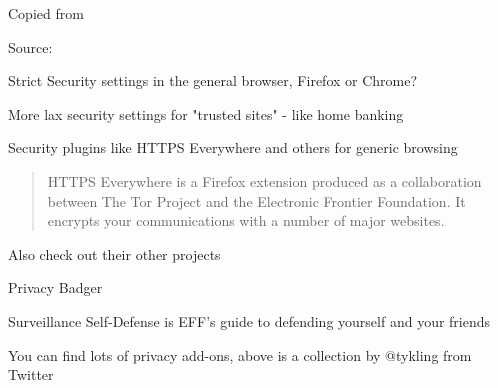 \documentclass[20pt,landscape,a4paper,footrule]{foils}
\begin{document}
Copied from 





Source:



\begin{list2}
\item Strict Security settings in the general browser, Firefox or Chrome?
\item More lax security settings for "trusted sites" - like home banking
\item Security plugins like HTTPS Everywhere and others for generic browsing
\end{list2}


\begin{quote}
HTTPS Everywhere is a Firefox extension produced as a collaboration between The Tor Project and the Electronic Frontier Foundation. It encrypts your communications with a number of major websites.
\end{quote}

\centerline{}

\begin{list2}
\item Also check out their other projects
\item Privacy Badger 
\item Surveillance Self-Defense is EFF's guide to defending yourself and your friends\\
\end{list2}



You can find lots of privacy add-ons, above is a collection by @tykling from Twitter
{\tiny
{}\\
}

\end{document}

